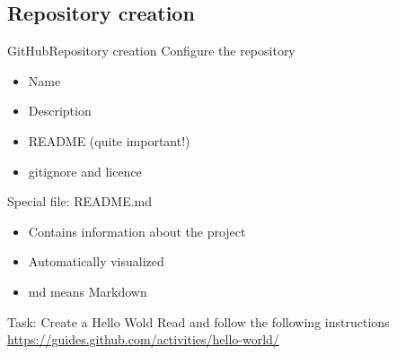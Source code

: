 \documentclass[10pt,compress]{beamer} %
\begin{document}
\subsection{Repository creation}
\begin{frame}{GitHub}{Repository creation}
	Configure the repository
	\begin{itemize}
		\item Name
		\item Description
		\item README (quite important!)
		\item gitignore and licence
	\end{itemize}
	Special file: README.md
	\begin{itemize}
		\item Contains information about the project
		\item Automatically visualized
		\item md means Markdown
	\end{itemize}

	\begin{block}{Task: Create a Hello Wold}
		Read and follow the following instructions\\
		\url{https://guides.github.com/activities/hello-world/}
	\end{block}
\end{frame}
\end{document}
